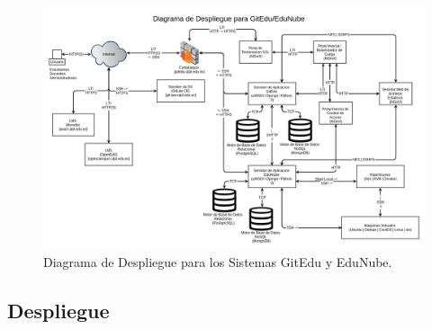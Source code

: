 \begin{landscape}
	\begin{figure}
	  \begin{center}
	    \includegraphics[width=1.4\textwidth]{Figures/desp_ge_en.png}
	  \end{center}
	  \caption{Diagrama de Despliegue para los Sistemas GitEdu y EduNube.}
	  \label{desp_ge_en}
	\end{figure}
\end{landscape}

\subsection{Despliegue}

